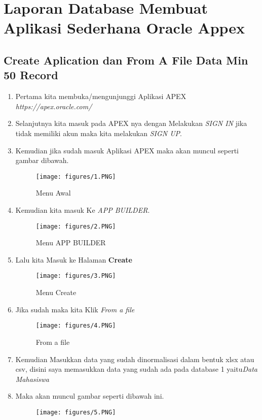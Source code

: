 \chapter{Laporan Database Membuat Aplikasi Sederhana Oracle Appex}
\section{Create Aplication dan From A File Data Min 50 Record}
\par
\begin{enumerate}
    \item Pertama kita membuka/mengunjunggi Aplikasi APEX \textit{https://apex.oracle.com/} 
    \item Selanjutnya kita masuk pada APEX nya dengan Melakukan \textit{SIGN IN} jika tidak memiliki akun maka kita melakukan \textit{SIGN UP}.
    \item Kemudian jika sudah masuk Aplikasi APEX  maka akan muncul seperti gambar dibawah.
    \begin{figure}[!htbp]
\centering
\texttt{[image: figures/1.PNG]}
\caption{Menu Awal}
\label{penanda}
\end{figure}
    \item Kemudian kita masuk Ke \textit{APP BUILDER}.
\begin{figure}[!htbp]
\centering
\texttt{[image: figures/2.PNG]}
\caption{Menu APP BUILDER}
\label{penanda}
\end{figure}
    \item Lalu kita Masuk ke Halaman \textbf{Create}
\begin{figure}[!htbp]
\centering
\texttt{[image: figures/3.PNG]}
\caption{Menu Create}
\label{penanda}
\end{figure}
    \item Jika sudah maka kita Klik \textit{From a file}
\begin{figure}[!htbp]
\centering
\texttt{[image: figures/4.PNG]}
\caption{From a file}
\label{penanda}
\end{figure}
\item Kemudian Masukkan data yang sudah dinormalisasi dalam bentuk xlsx atau csv, disini saya memasukkan data yang sudah ada pada database 1 yaitu\textit{Data Mahasiswa} 
\item Maka akan muncul gambar seperti dibawah ini.
\begin{figure}[!htbp]
\centering
\texttt{[image: figures/5.PNG]}

\end{figure}
\end{enumerate}
